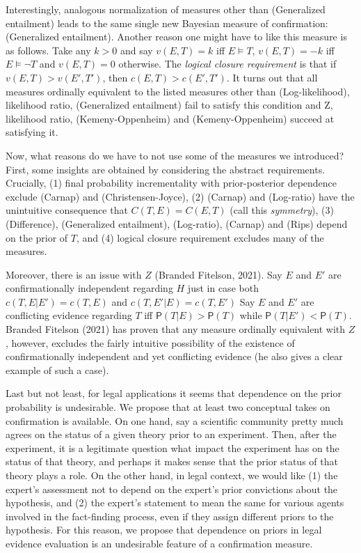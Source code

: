 \documentclass[
  10pt,
  dvipsnames,enabledeprecatedfontcommands]{scrartcl}
\newcommand{\n}{\neg}
\newcommand{\pr}[1]{\mathsf{P}(#1)}
\begin{document}
Interestingly, analogous normalization of measures other than
(Generalized entailment) leads to the same single new Bayesian measure
of confirmation: (Generalized entailment). Another reason one might have
to like this measure is as follows. Take any \(k > 0\) and say
\(v(E,T) =k\) iff \(E\models T\), \(v(E,T) = -k\) iff \(E \models \n T\)
and \(v(E,T)=0\) otherwise. The \emph{logical closure requirement} is
that if \(v(E,T) > v(E', T')\), then \(c(E, T) > c(E' , T' )\). It turns
out that all measures ordinally equivalent to the listed measures other
than (Log-likelihood), likelihood ratio, (Generalized entailment) fail
to satisfy this condition and Z, likelihood ratio, (Kemeny-Oppenheim)
and (Kemeny-Oppenheim) succeed at satisfying it.

Now, what reasons do we have to not use some of the measures we
introduced? First, some insights are obtained by considering the
abstract requirements. Crucially, (1) final probability incrementality
with prior-posterior dependence exclude (Carnap) and
(Christensen-Joyce), (2) (Carnap) and (Log-ratio) have the unintuitive
consequence that \(C(T,E)= C(E,T)\) (call this \emph{symmetry}), (3)
(Difference), (Generalized entailment), (Log-ratio), (Carnap) and (Rips)
depend on the prior of \(T\), and (4) logical closure requirement
excludes many of the measures.

Moreover, there is an issue with \(Z\) (Branded Fitelson, 2021). Say
\(E\) and \(E'\) are confirmationally independent regarding \(H\) just
in case both \(c(T, E \vert E' ) = c(T, E )\) and
\(c(T, E' \vert E ) = c(T, E')\) Say \(E\) and \(E'\) are conflicting
evidence regarding \(T\) iff \(\pr{T\vert E}> \pr{T}\) while
\(\pr{T\vert E'} < \pr{T}\). Branded Fitelson (2021) has proven that any
measure ordinally equivalent with \(Z\), however, excludes the fairly
intuitive possibility of the existence of confirmationally independent
and yet conflicting evidence (he also gives a clear example of such a
case).

Last but not least, for legal applications it seems that dependence on
the prior probability is undesirable. We propose that at least two
conceptual takes on confirmation is available. On one hand, say a
scientific community pretty much agrees on the status of a given theory
prior to an experiment. Then, after the experiment, it is a legitimate
question what impact the experiment has on the status of that theory,
and perhaps it makes sense that the prior status of that theory plays a
role. On the other hand, in legal context, we would like (1) the
expert's assessment not to depend on the expert's prior convictions
about the hypothesis, and (2) the expert's statement to mean the same
for various agents involved in the fact-finding process, even if they
assign different priors to the hypothesis. For this reason, we propose
that dependence on priors in legal evidence evaluation is an undesirable
feature of a confirmation measure.
\end{document}
